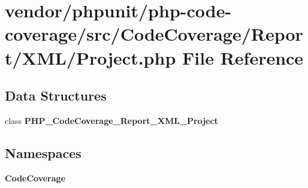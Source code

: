 \section{vendor/phpunit/php-\/code-\/coverage/src/\+Code\+Coverage/\+Report/\+X\+M\+L/\+Project.php File Reference}
\label{vendor_2phpunit_2php-code-coverage_2src_2_code_coverage_2_report_2_x_m_l_2_project_8php}
\subsection*{Data Structures}
\begin{DoxyCompactItemize}
\item 
class {\bf P\+H\+P\+\_\+\+Code\+Coverage\+\_\+\+Report\+\_\+\+X\+M\+L\+\_\+\+Project}
\end{DoxyCompactItemize}
\subsection*{Namespaces}
\begin{DoxyCompactItemize}
\item 
 {\bf Code\+Coverage}
\end{DoxyCompactItemize}
